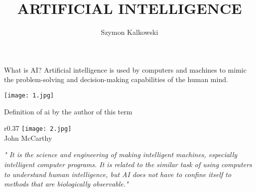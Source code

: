 \documentclass{beamer}
\title{ARTIFICIAL INTELLIGENCE}
\author{Szymon Kalkowski}
\begin{document}
\begin{frame}
\titlepage
\end{frame}

\begin{frame}{What is AI?}
Artificial intelligence is used by computers and machines to mimic the problem-solving and decision-making capabilities of the human mind.
\pause
\begin{center}
\texttt{[image: 1.jpg]}\cite{zdj1}
\end{center}
\end{frame}

\begin{frame}{Definition of ai by the author of this term}

\begin{wrapfigure}{r}{0.37\textwidth}
\texttt{[image: 2.jpg]}\\
John McCarthy \cite{zdj2}
\end{wrapfigure}
\textit{" It is the science and engineering of making intelligent machines, especially intelligent computer programs. It is related to the similar task of using computers to understand human intelligence, but AI does not have to confine itself to methods that are biologically observable."}
\end{frame}

\end{document}
